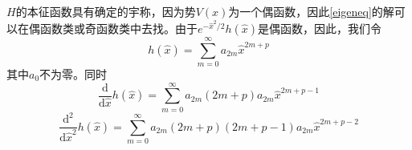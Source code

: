 \documentclass[]{article}
\begin{document}
$H$的本征函数具有确定的宇称，因为势$V(x)$为一个偶函数，因此\eqref{eigeneq}的解可以在偶函数类或奇函数类中去找。由于$e^{-\widehat{x}^2/2}h(\widehat{x})$是偶函数，因此，我们令
\begin{equation}
	h(\widehat{x})=\sum\limits_{m=0}^{\infty}a_{2m}\widehat{x}^{2m+p}
	\label{ty1}
\end{equation}
其中$a_0$不为零。同时
\begin{equation}
	\dfrac{\mathrm{d}}{\mathrm{d}\widehat{x}}h(\widehat{x})=\sum\limits_{m=0}^{\infty}a_{2m}(2m+p)a_{2m}\widehat{x}^{2m+p-1}
	\label{ty2}
\end{equation}
\begin{equation}
	\dfrac{\mathrm{d}^2}{\mathrm{d}\widehat{x}^2}h(\widehat{x})=\sum\limits_{m=0}^{\infty}a_{2m}(2m+p)(2m+p-1)a_{2m}\widehat{x}^{2m+p-2}
	\label{ty3}
\end{equation}
\end{document}
